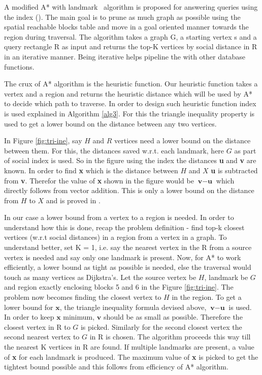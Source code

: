 A modified A* with landmark~\cite{AC2005} algorithm is proposed for answering {\query} queries using the {\grp} index ({\rrp}). The main goal is to prune as much graph as possible using the spatial reachable blocks table and move in a goal oriented manner towards the region during traversal. The algorithm takes a graph G, a starting vertex s and a query rectangle R as input and returns the top-K vertices by social distance in R in an iterative manner. Being iterative helps pipeline the {\rrp} with other database functions.

The crux of A* algorithm is the heuristic function. Our heuristic function takes a vertex and a region and returns the heuristic distance which will be used by A* to decide which path to traverse. In order to design such heuristic function {\rrpsocial} index is used explained in Algorithm \ref{alg3}. For this the triangle inequality property is used to get a lower bound on the distance between any two vertices.

In Figure \ref{fig:tri-ine}, say $H$ and $R$ vertices need a lower bound on the distance between them. For this, the distances saved w.r.t. each landmark, here $G$ as part of social {\rrp} index is used. So in the figure using the index the distances \textbf{u} and \textbf{v} are known. In order to find \textbf{x} which is the distance between $H$ and $X$ \textbf{u} is subtracted from \textbf{v}. Therefor the value of \textbf{x} shown in the figure would be $\textbf{v} - \textbf{u}$ which directly follows from vector addition. This is only a lower bound on the distance from $H$ to $X$ and is proved in \cite{AC2005}.

In our case a lower bound from a vertex to a region is needed. In order to understand how this is done, recap the problem definition - find top-k closest vertices (w.r.t social distances) in a region from a vertex in a graph. To understand better, set K = 1, i.e. say the nearest vertex in the R from a source vertex is needed and say only one landmark is present. Now, for A* to work efficiently, a lower bound as tight as possible is needed, else the traversal would touch as many vertices as Dijkstra's. Let the source vertex be $H$, landmark be $G$ and region exactly enclosing blocks 5 and 6 in the Figure \ref{fig:tri-ine}. The problem now becomes finding the closest vertex to $H$ in the region. To get a lower bound for $\textbf{x}$, the triangle inequality formula devised above, $\textbf{v} - \textbf{u}$ is used. In order to keep $\textbf{x}$ minimum, $\textbf{v}$ should be as small as possible. Therefore the closest vertex in R to $G$ is picked. Similarly for the second closest vertex the second nearest vertex to $G$ in R is chosen. The algorithm proceeds this way till the nearest K vertices in R are found. If multiple landmarks are present, a value of \textbf{x} for each landmark is produced. The maximum value of \textbf{x} is picked to get the tightest bound possible and this follows from efficiency of A* algorithm.

